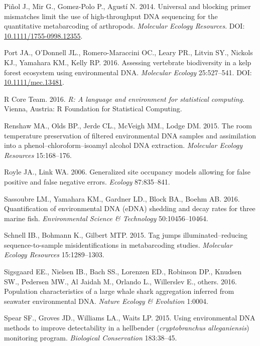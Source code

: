 \documentclass[fleqn,10pt,lineno]{wlpeerj} %
\begin{document}
\hypertarget{ref-Pinol2014}{}
Piñol J., Mir G., Gomez-Polo P., Agustí N. 2014. Universal and blocking
primer mismatches limit the use of high-throughput DNA sequencing for
the quantitative metabarcoding of arthropods. \emph{Molecular Ecology
Resources}. DOI:
\href{https://doi.org/10.1111/1755-0998.12355}{10.1111/1755-0998.12355}.

\hypertarget{ref-MEC:MEC13481}{}
Port JA., O'Donnell JL., Romero-Maraccini OC., Leary PR., Litvin SY.,
Nickols KJ., Yamahara KM., Kelly RP. 2016. Assessing vertebrate
biodiversity in a kelp forest ecosystem using environmental DNA.
\emph{Molecular Ecology} 25:527--541. DOI:
\href{https://doi.org/10.1111/mec.13481}{10.1111/mec.13481}.

\hypertarget{ref-RcoreTeam}{}
R Core Team. 2016. \emph{R: A language and environment for statistical
computing}. Vienna, Austria: R Foundation for Statistical Computing.

\hypertarget{ref-renshaw2015room}{}
Renshaw MA., Olds BP., Jerde CL., McVeigh MM., Lodge DM. 2015. The room
temperature preservation of filtered environmental DNA samples and
assimilation into a phenol--chloroform--isoamyl alcohol DNA extraction.
\emph{Molecular Ecology Resources} 15:168--176.

\hypertarget{ref-royle2006generalized}{}
Royle JA., Link WA. 2006. Generalized site occupancy models allowing for
false positive and false negative errors. \emph{Ecology} 87:835--841.

\hypertarget{ref-sassoubre2016quantification}{}
Sassoubre LM., Yamahara KM., Gardner LD., Block BA., Boehm AB. 2016.
Quantification of environmental DNA (eDNA) shedding and decay rates for
three marine fish. \emph{Environmental Science \& Technology}
50:10456--10464.

\hypertarget{ref-schnell2015tag}{}
Schnell IB., Bohmann K., Gilbert MTP. 2015. Tag jumps
illuminated--reducing sequence-to-sample misidentifications in
metabarcoding studies. \emph{Molecular Ecology Resources} 15:1289--1303.

\hypertarget{ref-sigsgaard2016population}{}
Sigsgaard EE., Nielsen IB., Bach SS., Lorenzen ED., Robinson DP.,
Knudsen SW., Pedersen MW., Al Jaidah M., Orlando L., Willerslev E.,
others. 2016. Population characteristics of a large whale shark
aggregation inferred from seawater environmental DNA. \emph{Nature
Ecology \& Evolution} 1:0004.

\hypertarget{ref-spear2015using}{}
Spear SF., Groves JD., Williams LA., Waits LP. 2015. Using environmental
DNA methods to improve detectability in a hellbender
(\emph{cryptobranchus alleganiensis}) monitoring program.
\emph{Biological Conservation} 183:38--45.
\end{document}
